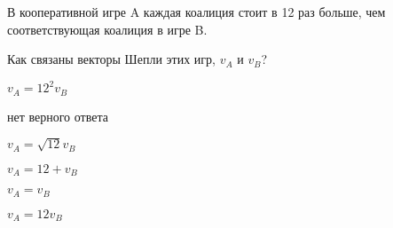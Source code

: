 
\begin{question}
В кооперативной игре A каждая коалиция стоит в 12 раз больше,
чем соответствующая коалиция в игре B.

Как связаны векторы Шепли этих игр, \(v_A\) и \(v_B\)?
\begin{answerlist}
  \item \(v_A = 12^2 v_B\)
  \item нет верного ответа
  \item \(v_A = \sqrt{12} v_B\)
  \item \(v_A = 12 + v_B\)
  \item \(v_A = v_B\)
  \item \(v_A = 12 v_B\)
\end{answerlist}
\end{question}


